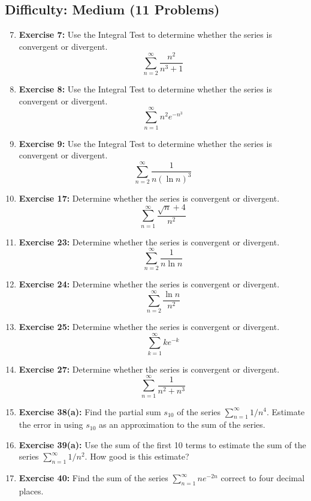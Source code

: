 \documentclass{article}
\begin{document}
\subsection*{Difficulty: Medium (11 Problems)}
\begin{enumerate}
    \setcounter{enumi}{6} %
    \item \textbf{Exercise 7:} Use the Integral Test to determine whether the series is convergent or divergent.
    \[ \sum_{n=2}^{\infty} \dfrac{n^2}{n^3+1} \]
    \item \textbf{Exercise 8:} Use the Integral Test to determine whether the series is convergent or divergent.
    \[ \sum_{n=1}^{\infty} n^2 e^{-n^3} \]
    \item \textbf{Exercise 9:} Use the Integral Test to determine whether the series is convergent or divergent.
    \[ \sum_{n=2}^{\infty} \dfrac{1}{n(\ln n)^3} \]
    \item \textbf{Exercise 17:} Determine whether the series is convergent or divergent.
    \[ \sum_{n=1}^{\infty} \dfrac{\sqrt{n}+4}{n^2} \]
    \item \textbf{Exercise 23:} Determine whether the series is convergent or divergent.
    \[ \sum_{n=2}^{\infty} \dfrac{1}{n \ln n} \]
    \item \textbf{Exercise 24:} Determine whether the series is convergent or divergent.
    \[ \sum_{n=2}^{\infty} \dfrac{\ln n}{n^2} \]
    \item \textbf{Exercise 25:} Determine whether the series is convergent or divergent.
    \[ \sum_{k=1}^{\infty} k e^{-k} \]
    \item \textbf{Exercise 27:} Determine whether the series is convergent or divergent.
    \[ \sum_{n=1}^{\infty} \dfrac{1}{n^2 + n^3} \]
    \item \textbf{Exercise 38(a):} Find the partial sum $s_{10}$ of the series $\sum_{n=1}^{\infty} 1/n^4$. Estimate the error in using $s_{10}$ as an approximation to the sum of the series.
    \item \textbf{Exercise 39(a):} Use the sum of the first 10 terms to estimate the sum of the series $\sum_{n=1}^{\infty} 1/n^2$. How good is this estimate?
    \item \textbf{Exercise 40:} Find the sum of the series $\sum_{n=1}^{\infty} n e^{-2n}$ correct to four decimal places.
\end{enumerate}

\hrulefill
\vspace{1em}
\end{document}
